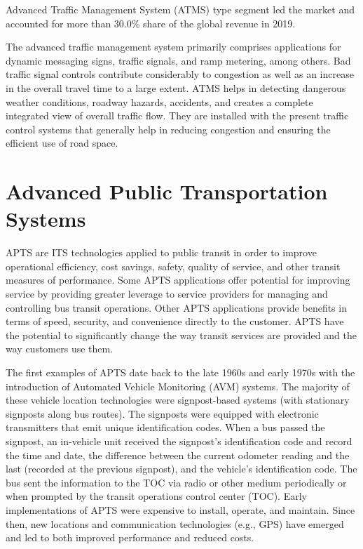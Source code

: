 \hspace{2cm}Advanced Traffic Management System (ATMS) type segment led the market and accounted for more than 30.0\% share of the global revenue in 2019.

The advanced traffic management system primarily comprises applications for dynamic messaging signs, traffic signals, and ramp metering, among others. Bad traffic signal controls contribute considerably to congestion as well as an increase in the overall travel time to a large extent. ATMS helps in detecting dangerous weather conditions, roadway hazards, accidents, and creates a complete integrated view of overall traffic flow. They are installed with the present traffic control systems that generally help in reducing congestion and ensuring the efficient use of road space.\cite{web003}



\section{Advanced Public Transportation Systems}

\hspace{2cm}APTS are ITS technologies applied to public transit in order to improve operational efficiency, cost savings, safety, quality of service, and other transit measures of performance. Some APTS applications offer potential for improving service by providing greater leverage to service providers for managing and controlling bus transit operations. Other APTS applications provide benefits in terms of speed, security, and convenience directly to the customer. APTS have the potential to significantly change the way transit services are provided and the way customers use them.

The first examples of APTS date back to the late 1960s and early 1970s with the introduction of Automated Vehicle Monitoring (AVM) systems. The majority of these vehicle location technologies were signpost-based systems (with stationary signposts along bus routes). The signposts were equipped with electronic transmitters that emit unique identification codes. When a bus passed the signpost, an in-vehicle unit received the signpost’s identification code and record the time and date, the difference between the current odometer reading and the last (recorded at the previous signpost), and the vehicle’s identification code. The bus sent the information to the TOC via radio or other medium periodically or when prompted by the transit operations control center (TOC). Early implementations of APTS were expensive to install, operate, and maintain. Since then, new locations and communication technologies (e.g., GPS) have emerged and led to both improved performance and reduced costs.\cite{web004}

